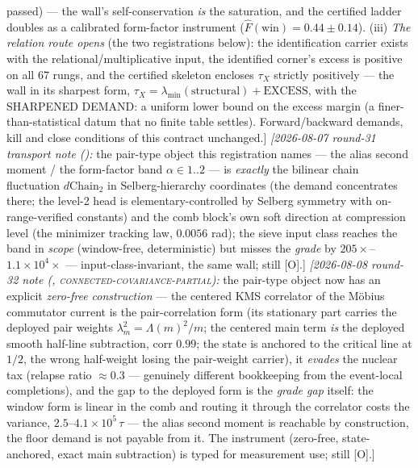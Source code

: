 {passed) --- the wall's self-conservation \emph{is} the
saturation, and the certified ladder doubles as a calibrated
form-factor instrument ($\hat F(\mathrm{win}) = 0.44 \pm 0.14$).
(iii) \emph{The relation route opens} (the two registrations
below): the identification carrier exists with the
relational/multiplicative input, the identified corner's excess
is positive on all $67$ rungs, and the certified skeleton
encloses $\tau_X$ strictly positively --- the wall in its
sharpest form, $\tau_X = \lambda_{\min}(\text{structural}) +
\text{EXCESS}$, with the SHARPENED DEMAND: a uniform lower bound
on the excess margin (a finer-than-statistical datum that no
finite table settles).  Forward/backward demands, kill and close
conditions of this contract unchanged.]
\emph{[2026-08-07 round-31 transport note
():} the pair-type object this
registration names --- the alias second moment / the form-factor
band $\alpha \in 1..2$ --- is \emph{exactly} the bilinear chain
fluctuation $d\mathrm{Chain}_2$ in Selberg-hierarchy coordinates
(the demand concentrates there; the level-2 head is
elementary-controlled by Selberg symmetry with on-range-verified
constants) and the comb block's own soft direction at
compression level (the minimizer tracking law, $0.0056$ rad);
the sieve input class reaches the band in \emph{scope}
(window-free, deterministic) but misses the \emph{grade} by
$205\times$--$1.1\times10^4\times$ --- input-class-invariant,
the same wall; still [O].]
\emph{[2026-08-08 round-32 note
(,
\textsc{connected-covariance-partial}):} the pair-type object
now has an explicit \emph{zero-free construction} --- the
centered KMS correlator of the M\"obius commutator current is
the pair-correlation form (its stationary part carries the
deployed pair weights $\lambda_m^2 = \Lambda(m)^2/m$; the
centered main term \emph{is} the deployed smooth half-line
subtraction, corr $0.99$; the state is anchored to the critical
line at $1/2$, the wrong half-weight losing the pair-weight
carrier), it \emph{evades} the nuclear tax (relapse ratio
$\approx 0.3$ --- genuinely different bookkeeping from the
event-local completions), and the gap to the deployed form is
the \emph{grade gap} itself: the window form is linear in the
comb and routing it through the correlator costs the variance,
$2.5$--$4.1\times10^5\,\tau$ --- the alias second moment is
reachable by construction, the floor demand is not payable from
it.  The instrument (zero-free, state-anchored, exact main
subtraction) is typed for measurement use; still [O].]
}
